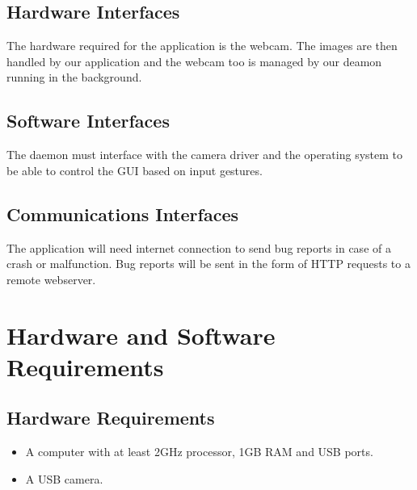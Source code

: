 \documentclass{scrreprt}
\begin{document}
\section{Hardware Interfaces}
The hardware required for the application is the webcam. The images are then handled by our application and the webcam too is managed by our deamon running in the background.

\section{Software Interfaces}
The daemon must interface with the camera driver and the operating system to be able to control the GUI based on input gestures.

\section{Communications Interfaces}
The application will need internet connection to send bug reports in case of a crash or malfunction. Bug reports will be sent in the form of HTTP requests to a remote webserver.

\chapter{Hardware and Software Requirements}
\section{Hardware Requirements}
\begin{itemize}
    \item A computer with at least 2GHz processor, 1GB RAM and USB ports.
    \item A USB camera.
\end{itemize}
\end{document}
